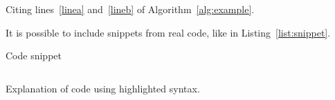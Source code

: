 \documentclass[a4paper, 12pt]{article}
\begin{document}
Citing lines~\ref{linea} and~\ref{lineb} of Algorithm~\ref{alg:example}.

It is possible to include snippets from real code, like in Listing~\ref{list:snippet}.

\begin{listing}[hbf!]
  \caption{Code snippet}
  \label{list:snippet}
  \inputminted{cpp}{./snippets/hello.cpp}
\end{listing}

Explanation of code using highlighted syntax.

\end{document}
